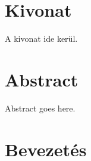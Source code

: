 \documentclass[12pt,a4paper,english,magyar,oneside]{report}
\begin{document}

\setcounter{tocdepth}{2} %
\tableofcontents %

\chapter*{Kivonat}

A kivonat ide kerül.


\chapter*{Abstract}

Abstract goes here.


\chapter{Bevezetés}

\end{document}
